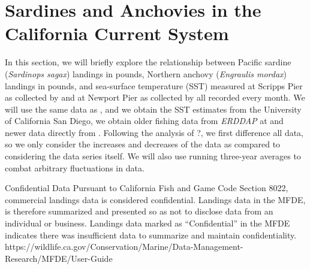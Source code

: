 \documentclass[11pt, a4paper]{memoir}
\theoremstyle{plain}
\theoremstyle{definition}
\begin{document}
\section{Sardines and Anchovies in the California Current System}
In this section, we will briefly explore the relationship between Pacific sardine (\textit{Sardinops sagax}) landings in pounds, Northern anchovy (\textit{Engraulis mordax}) landings in pounds, and sea-surface temperature (SST) measured at Scripps Pier as collected by \cite{Scripps} and at Newport Pier as collected by \cite{Newport} all recorded every month. We will use the same data as \cite{Sugihara}, and we obtain the SST estimates from the University of California San Diego, we obtain older fishing data from \textit{ERDDAP} at \cite{oldData} and newer data directly from \cite{newData}. Following the analysis of ?, we first difference all data, so we only consider the increases and decreases of the data as compared to considering the data series itself. We will also use running three-year averages to combat arbitrary fluctuations in data.

Confidential Data
Pursuant to California Fish and Game Code Section 8022, commercial landings data is considered confidential. Landings data in the MFDE, is therefore summarized and presented so as not to disclose data from an individual or business. Landings data marked as “Confidential” in the MFDE indicates there was insufficient data to summarize and maintain confidentiality.
https://wildlife.ca.gov/Conservation/Marine/Data-Management-Research/MFDE/User-Guide
\end{document}
